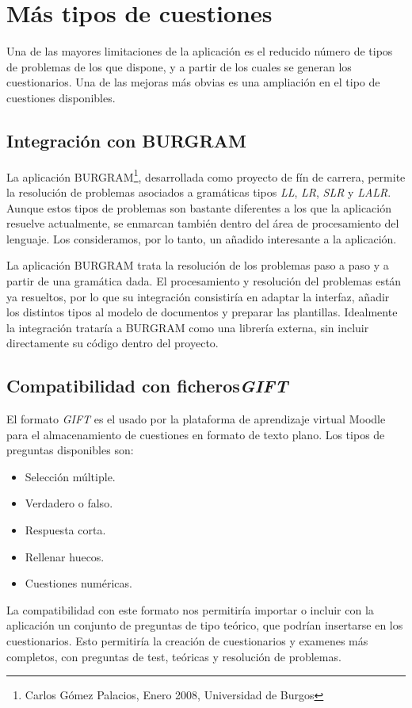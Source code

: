 \section{Más tipos de cuestiones}
Una de las mayores limitaciones de la aplicación es el reducido número de tipos de problemas de los que dispone, y a partir de los cuales se generan los cuestionarios.
Una de las mejoras más obvias es una ampliación en el tipo de cuestiones disponibles.

\subsection{Integración con BURGRAM}
La aplicación BURGRAM\footnote{Carlos Gómez Palacios, Enero 2008, Universidad de Burgos}, desarrollada como proyecto de fín de carrera, permite la resolución de problemas asociados a gramáticas tipos \emph{LL}, \emph{LR}, \emph{SLR} y \emph{LALR}.
Aunque estos tipos de problemas son bastante diferentes a los que la aplicación resuelve actualmente, se enmarcan también dentro del área de procesamiento del lenguaje.
Los consideramos, por lo tanto, un añadido interesante a la aplicación.

La aplicación BURGRAM trata la resolución de los problemas paso a paso y a partir de una gramática dada.
El procesamiento y resolución del problemas están ya resueltos, por lo que su integración consistiría en adaptar la interfaz, añadir los distintos tipos al modelo de documentos y preparar las plantillas.
Idealmente la integración trataría a BURGRAM como una librería externa, sin incluir directamente su código dentro del proyecto.

\subsection{Compatibilidad con ficheros\emph{GIFT}}
El formato \emph{GIFT} es el usado por la plataforma de aprendizaje virtual Moodle para el almacenamiento de cuestiones en formato de texto plano.
Los tipos de preguntas disponibles son:
\begin{itemize}
	\item Selección múltiple.
	\item Verdadero o falso.
	\item Respuesta corta.
	\item Rellenar huecos.
	\item Cuestiones numéricas.
\end{itemize}

La compatibilidad con este formato nos permitiría importar o incluir con la aplicación un conjunto de preguntas de tipo teórico, que podrían insertarse en los cuestionarios.
Esto permitiría la creación de cuestionarios y examenes más completos, con preguntas de test, teóricas y resolución de problemas.